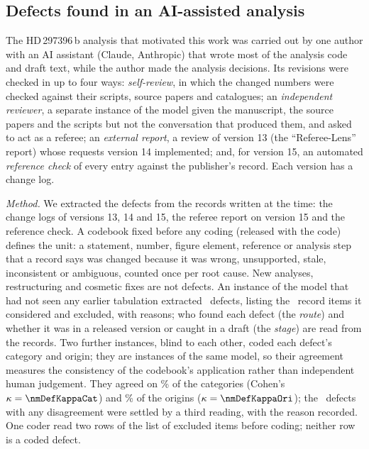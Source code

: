 \subsection{Defects found in an AI-assisted analysis}

The HD\,297396\,b analysis that motivated this work was carried out by one author
with an AI assistant (Claude, Anthropic) that wrote most of the analysis code and
draft text, while the author made the analysis decisions. Its revisions were checked
in up to four ways: \emph{self-review}, in which the changed numbers were checked
against their scripts, source papers and catalogues; an \emph{independent reviewer},
a separate instance of the model given the manuscript, the source papers and the
scripts but not the conversation that produced them, and asked to act as a referee;
an \emph{external report}, a review of version 13 (the ``Referee-Lens'' report)
whose requests version 14 implemented; and, for version 15, an automated \emph{reference check} of every entry
against the publisher's record. Each version has a change log.

\emph{Method.} We extracted the defects from the records written at the time: the
change logs of versions 13, 14 and 15, the referee report on version 15 and the
reference check. A codebook fixed before any coding (released with the code) defines
the unit: a statement, number, figure element, reference or analysis step that a
record says was changed because it was wrong, unsupported, stale, inconsistent or
ambiguous, counted once per root cause. New analyses, restructuring and cosmetic
fixes are not defects. An instance of the model that had not seen any earlier
tabulation extracted \nmDefN\ defects, listing the \nmDefExcluded\ record items it
considered and excluded, with reasons; who found each defect (the \emph{route}) and
whether it was in a released version or caught in a draft (the \emph{stage}) are read
from the records. Two further instances, blind to each other, coded each defect's
category and origin; they are instances of the same model, so their agreement measures the
consistency of the codebook's application rather than independent human judgement. They agreed on \nmDefAgreeCat\% of the categories (Cohen's
$\kappa = \nmDefKappaCat$) and \nmDefAgreeOri\% of the origins
($\kappa = \nmDefKappaOri$); the \nmDefDisagree\ defects with any disagreement were
settled by a third reading, with the reason recorded. One coder read two rows of the
list of excluded items before coding; neither row is a coded defect.

